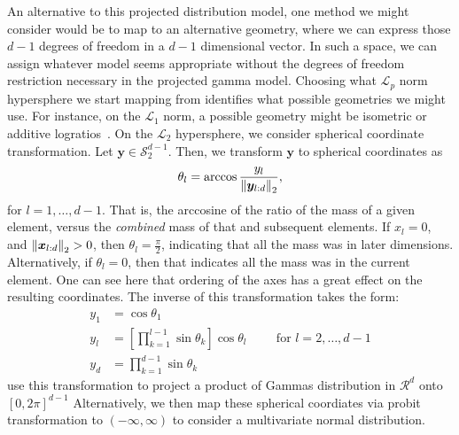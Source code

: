 An alternative to this projected distribution model, one method we might consider would be to map
  to an alternative geometry, where we can express those $d-1$ degrees of freedom in a $d-1$
  dimensional vector.  In such a space, we can assign whatever model seems appropriate without the
  degrees of freedom restriction necessary in the projected gamma model.  Choosing what $\mathcal{L}_p$
  norm hypersphere we start mapping from identifies what possible geometries we might use.  For instance,
  on the $\mathcal{L}_1$ norm, a possible geometry might be isometric or additive
  logratios~\citep{aitchison1982}.  On the $\mathcal{L}_2$ hypersphere, we consider spherical
  coordinate transformation. Let $\bm{y} \in \mathcal{S}_{2}^{d-1}$. Then, we transform $\bm{y}$
  to spherical coordinates as
  \begin{equation*}
    \theta_l = \arccos\frac{y_l}{\left\lVert \bm{y}_{l:d} \right\rVert_{2}},
  \end{equation*}
  for $l = 1,\ldots, d-1$. That is, the arccosine of the ratio of the mass of a given element,
  versus the \emph{combined} mass of that and subsequent elements.  If $x_l = 0$, and
  $\left\lVert \bm{x}_{l:d} \right\rVert_{2} > 0$, then $\theta_l = \frac{\pi}{2}$, indicating that all the mass was
  in later dimensions.  Alternatively, if $\theta_l = 0$, then that indicates all the mass was in
  the current element.  One can see here that ordering of the axes has a great effect on the
  resulting coordinates.  The inverse of this transformation takes the form:
  \begin{equation}
    \label{eqn:spherical}
    \begin{aligned}
      y_1 &= \cos\theta_1\\
      y_l &= \left[\prod_{k = 1}^{l-1}\sin\theta_k\right]\cos\theta_l \hspace{1cm}\text{for } l = 2,\ldots,d-1\\
      y_d &= \prod_{k = 1}^{d-1}\sin\theta_k
    \end{aligned}
  \end{equation}
  \cite{nunez2019} use this transformation to project a product of Gammas distribution in
  $\mathcal{R}^d$ onto $[0,2\pi]^{d-1}$ Alternatively, we then map these spherical coordiates via
  probit transformation to $(-\infty,\infty)$ to consider a multivariate normal distribution.

